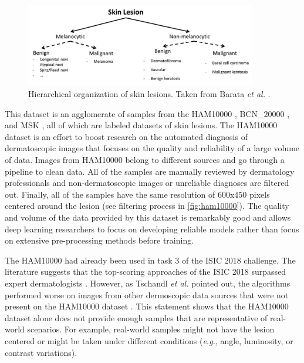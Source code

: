     \begin{figure}
      \centering
      \includegraphics[width=0.9\textwidth]{figs/skin_lesions_hierarchy.png}
      \caption[Hierarchical organization of skin lesions.]{Hierarchical organization of skin lesions. Taken from Barata \textit{et al.} \cite{Barata2020}.}
      \label{fig:hierarchy}
    \end{figure}
    
    This dataset is an agglomerate of samples from the HAM10000 \cite{ham10000}, BCN\_20000 \cite{bcn_20000}, and MSK \cite{msk}, all of which are labeled datasets of skin lesions. The \ac{HAM10000} dataset is an effort to boost research on the automated diagnosis of dermatoscopic images that focuses on the quality and reliability of a large volume of data. Images from \ac{HAM10000} belong to different sources and go through a pipeline to clean data. All of the samples are manually reviewed by dermatology professionals and non-dermatoscopic images or unreliable diagnoses are filtered out. Finally, all of the samples have the same resolution of 600x450 pixels centered around the lesion (see filtering process in \autoref{fig:ham10000}). The quality and volume of the data provided by this dataset is remarkably good and allows deep learning researchers to focus on developing reliable models rather than focus on extensive pre-processing methods before training. \par
    
    The \ac{HAM10000} had already been used in task 3 of the \ac{ISIC} 2018 challenge. The literature suggests that the top-scoring approaches of the \ac{ISIC} 2018 surpassed expert dermatologists \cite{humanvsisic2018}. However, as Tschandl \textit{et al.} pointed out, the algorithms performed worse on images from other dermoscopic data sources that were not present on the \ac{HAM10000} dataset \cite{humanvsisic2018}. This statement shows that the \ac{HAM10000} dataset alone does not provide enough samples that are representative of real-world scenarios. For example, real-world samples might not have the lesion centered or might be taken under different conditions (\textit{e.g.}, angle, luminosity, or contrast variations). \par
    
